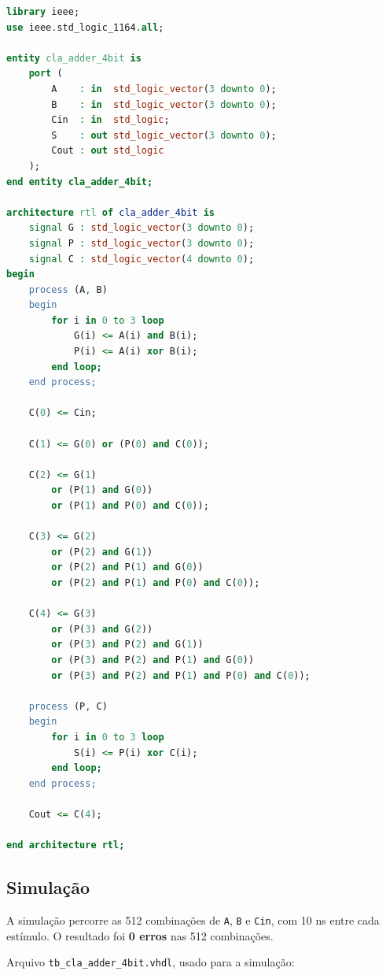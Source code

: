 \documentclass[report, 12pt]{uftreport}
\begin{document}
\begin{lstlisting}[language=VHDL]
library ieee;
use ieee.std_logic_1164.all;

entity cla_adder_4bit is
    port (
        A    : in  std_logic_vector(3 downto 0);
        B    : in  std_logic_vector(3 downto 0);
        Cin  : in  std_logic;
        S    : out std_logic_vector(3 downto 0);
        Cout : out std_logic
    );
end entity cla_adder_4bit;

architecture rtl of cla_adder_4bit is
    signal G : std_logic_vector(3 downto 0);
    signal P : std_logic_vector(3 downto 0);
    signal C : std_logic_vector(4 downto 0);
begin
    process (A, B)
    begin
        for i in 0 to 3 loop
            G(i) <= A(i) and B(i);
            P(i) <= A(i) xor B(i);
        end loop;
    end process;

    C(0) <= Cin;

    C(1) <= G(0) or (P(0) and C(0));

    C(2) <= G(1)
        or (P(1) and G(0))
        or (P(1) and P(0) and C(0));

    C(3) <= G(2)
        or (P(2) and G(1))
        or (P(2) and P(1) and G(0))
        or (P(2) and P(1) and P(0) and C(0));

    C(4) <= G(3)
        or (P(3) and G(2))
        or (P(3) and P(2) and G(1))
        or (P(3) and P(2) and P(1) and G(0))
        or (P(3) and P(2) and P(1) and P(0) and C(0));

    process (P, C)
    begin
        for i in 0 to 3 loop
            S(i) <= P(i) xor C(i);
        end loop;
    end process;

    Cout <= C(4);

end architecture rtl;
\end{lstlisting}

\subsection{Simulação}

A simulação percorre as 512 combinações de \texttt{A}, \texttt{B} e \texttt{Cin}, com 10 ns entre cada estímulo. O resultado foi \textbf{0 erros} nas 512 combinações.

Arquivo \texttt{tb\_cla\_adder\_4bit.vhdl}, usado para a simulação:
\end{document}
